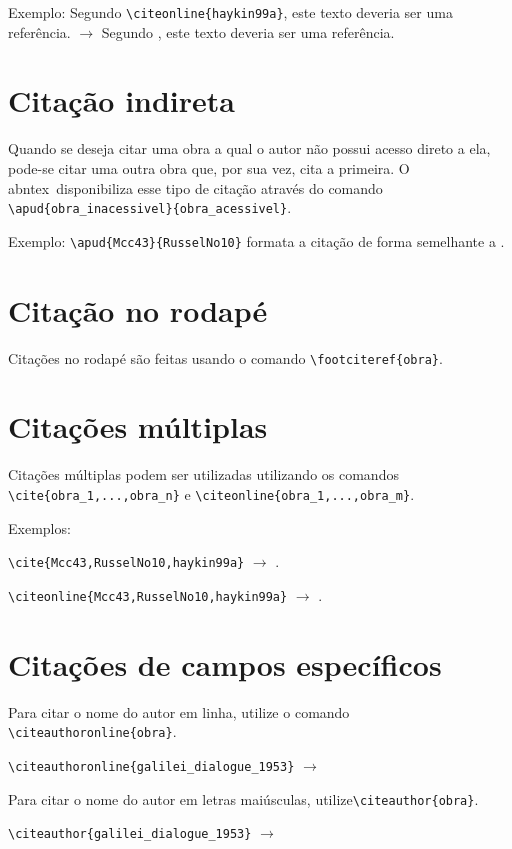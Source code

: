\documentclass{fei}
\begin{document}
    Exemplo: Segundo \verb+\citeonline{haykin99a}+, este texto deveria ser uma referência. $\to$ Segundo , este texto deveria ser uma referência.
	
	\section{Citação indireta}
	Quando se deseja citar uma obra a qual o autor não possui acesso direto a ela, pode-se citar uma outra obra que, por sua vez, cita a primeira. O \gls{abntex}~disponibiliza esse tipo de citação através do comando \verb+\apud{obra_inacessivel}{obra_acessivel}+.
	
	Exemplo: \verb++ formata a citação de forma semelhante a \apud{Mcc43}{RusselNo10}.
	
	\section{Citação no rodapé}
	
	Citações no rodapé são feitas usando o comando \verb+\footciteref{obra}+.
	
	\section{Citações múltiplas}
	
	Citações múltiplas podem ser utilizadas utilizando os comandos \verb+\cite{obra_1,...,obra_n}+ e \verb+\citeonline{obra_1,...,obra_m}+.
	
	Exemplos: 
	
	\verb+\cite{Mcc43,RusselNo10,haykin99a}+ \(\to\) \cite{Mcc43,RusselNo10,haykin99a}.
	
	\verb++ \(\to\) \citeonline{Mcc43,RusselNo10,haykin99a}.
	
	\section{Citações de campos específicos}
	
	Para citar o nome do autor em linha, utilize o comando \verb+\citeauthoronline{obra}+.

	\verb++ \(\to\) \citeauthoronline{galilei_dialogue_1953}
	
	Para citar o nome do autor em letras maiúsculas, utilize\verb+\citeauthor{obra}+.

	\verb+\citeauthor{galilei_dialogue_1953}+ \(\to\) \citeauthor{galilei_dialogue_1953}
\end{document}
